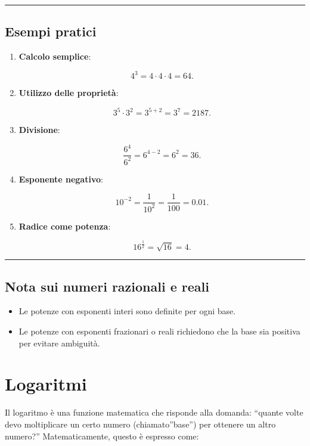 \documentclass[
  italian,
  letterpaper,
  a4paper,
  11pt,
  open=any]{scrbook}
\providecommand{\tightlist}{%
  \setlength{\itemsep}{0pt}\setlength{\parskip}{0pt}}
\theoremstyle{plain}
\theoremstyle{definition}
\theoremstyle{definition}
\theoremstyle{remark}
\begin{document}
\begin{center}\rule{0.5\linewidth}{0.5pt}\end{center}

\subsection{Esempi pratici}\label{esempi-pratici}

\begin{enumerate}
\def\labelenumi{\arabic{enumi}.}
\item
  \textbf{Calcolo semplice}:

  \[
  4^3 = 4 \cdot 4 \cdot 4 = 64.
  \]
\item
  \textbf{Utilizzo delle proprietà}:

  \[
  3^5 \cdot 3^2 = 3^{5+2} = 3^7 = 2187.
  \]
\item
  \textbf{Divisione}:

  \[
  \frac{6^4}{6^2} = 6^{4-2} = 6^2 = 36.
  \]
\item
  \textbf{Esponente negativo}:

  \[
  10^{-2} = \frac{1}{10^2} = \frac{1}{100} = 0.01.
  \]
\item
  \textbf{Radice come potenza}:

  \[
  16^{\frac{1}{2}} = \sqrt{16} = 4.
  \]
\end{enumerate}

\begin{center}\rule{0.5\linewidth}{0.5pt}\end{center}

\subsection{Nota sui numeri razionali e
reali}\label{nota-sui-numeri-razionali-e-reali}

\begin{itemize}
\tightlist
\item
  Le potenze con esponenti interi sono definite per ogni base.
\item
  Le potenze con esponenti frazionari o reali richiedono che la base sia
  positiva per evitare ambiguità.
\end{itemize}

\section{Logaritmi}\label{logaritmi}

Il logaritmo è una funzione matematica che risponde alla domanda:
``quante volte devo moltiplicare un certo numero (chiamato''base'') per
ottenere un altro numero?'' Matematicamente, questo è espresso come:
\end{document}
